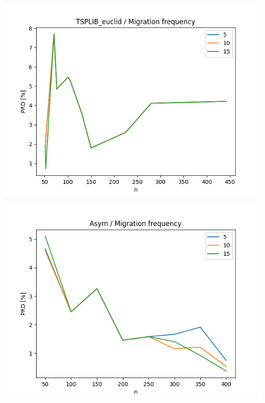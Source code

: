 \documentclass{article}
\begin{document}
\begin{center}
\includegraphics[width=\textwidth, 
                   height = 0.4\textheight, 
                   keepaspectratio]
                  {plots/tsplib_euclid_11_migration_freq} 
\end{center}

\begin{center}
\includegraphics[width=\textwidth, 
                   height = 0.4\textheight, 
                   keepaspectratio]
                  {plots/asym_11_migration_freq} 
\end{center}
\end{document}
